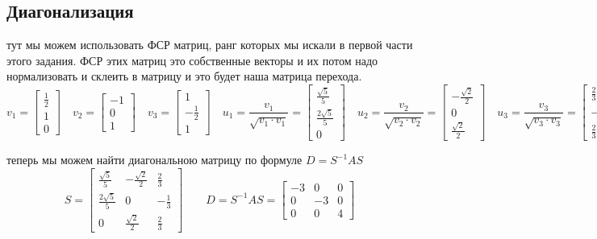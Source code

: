 \documentclass{article}
\renewcommand{\f}{\frac}
\begin{document}
  \subsection{Диагонализация}
  тут мы можем использовать ФСР матриц, ранг которых мы искали в первой части этого задания.
  ФСР этих матриц это собственные векторы и их потом надо нормализовать и склеить в матрицу и это будет наша матрица перехода.
  $$ v_1 = \left[\begin{matrix}\frac{1}{2}\\1\\0\end{matrix}\right] \quad
  v_2 = \left[\begin{matrix}-1\\0\\1\end{matrix}\right] \quad
  v_3 = \left[\begin{matrix}1\\- \frac{1}{2}\\1\end{matrix}\right] \quad
  u_1 = \f{v_1}{\sqrt{v_1 \cdot v_1}} = \left[\begin{matrix}\frac{\sqrt{5}}{5}\\\frac{2 \sqrt{5}}{5}\\0\end{matrix}\right] \quad
  u_2 = \f{v_2}{\sqrt{v_2 \cdot v_2}} = \left[\begin{matrix}- \frac{\sqrt{2}}{2}\\0\\\frac{\sqrt{2}}{2}\end{matrix}\right] \quad
  u_3 = \f{v_3}{\sqrt{v_3 \cdot v_3}} = \left[\begin{matrix}\frac{2}{3}\\- \frac{1}{3}\\\frac{2}{3}\end{matrix}\right]
  $$

  \noindent
  теперь мы можем найти диагональною матрицу по формуле $D = S^{-1}AS$
  $$ S = \left[\begin{matrix}\frac{\sqrt{5}}{5} & - \frac{\sqrt{2}}{2} & \frac{2}{3}\\\frac{2 \sqrt{5}}{5} & 0 & - \frac{1}{3}\\0 & \frac{\sqrt{2}}{2} & \frac{2}{3}\end{matrix}\right] \qquad
  D = S^{-1}AS = \left[\begin{matrix}-3 & 0 & 0\\0 & -3 & 0\\0 & 0 & 4\end{matrix}\right] $$
\end{document}
